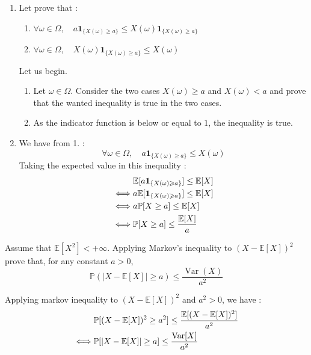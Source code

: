 \begin{solution}
  \begin{enumerate}
    \item Let prove that :
          \begin{enumerate}
            \item $\forall \omega \in \Omega, \quad a \mathbf{1}_{\{X(\omega) \geqslant a\}} \leqslant X(\omega) \mathbf{1}_{\{X(\omega) \geqslant a\}}$
            \item $\forall \omega \in \Omega, \quad X(\omega) \mathbf{1}_{\{X(\omega) \geqslant a\}} \leqslant X(\omega)$
          \end{enumerate}
          Let us begin.
          \begin{enumerate}
            \item Let $\omega \in \Omega$. Consider the two cases $X(\omega) \geq a$ and $X(\omega) < a$ and prove that the wanted inequality is true in the two cases.
            \item As the indicator function is below or equal to $1$, the inequality is true.
          \end{enumerate}
    \item We have from 1. :
          $$\forall \omega \in \Omega, \quad a \mathbf{1}_{\{X(\omega) \geqslant a\}} \leqslant X(\omega)$$
          Taking the expected value in this inequality :
          \begin{align*}
                 & \mathbb{E}[a \mathbf{1}_{\{X(\omega) \geqslant a\}}] \leq \mathbb{E}[X] \\
            \iff & a \mathbb{E}[\mathbf{1}_{\{X(\omega) \geqslant a\}}] \leq \mathbb{E}[X] \\
            \iff & a \mathbb{P}[X \geq a] \leq \mathbb{E}[X]                                   \\
            \iff & \mathbb{P}[X \geq a] \leq \frac{\mathbb{E}[X]}{a}
          \end{align*}
  \end{enumerate}
\end{solution}

\begin{Exercise}
  Assume that $\mathbb{E}\left[X^2\right]<+\infty$. Applying Markov's inequality to $(X-\mathbb{E}[X])^2$ prove that, for any constant $a>0$,
  $$
    \mathbb{P}(|X-\mathbb{E}[X]| \geq a) \leq \frac{\operatorname{Var}(X)}{a^2}
  $$
\end{Exercise}

\begin{solution}
  Applying markov inequality to $(X-\mathbb{E}[X])^2$ and $a^2 > 0$, we have :
  \begin{align*}
         & \mathbb{P}[(X-\mathbb{E}[X])^2 \geq a^2] \leq \frac{\mathbb{E}[(X-\mathbb{E}[X])^2]}{a^2} \\
    \iff & \mathbb{P}[|X-\mathbb{E}[X]| \geq a] \leq \frac{\operatorname{Var}[X]}{a^2}
  \end{align*}
\end{solution}